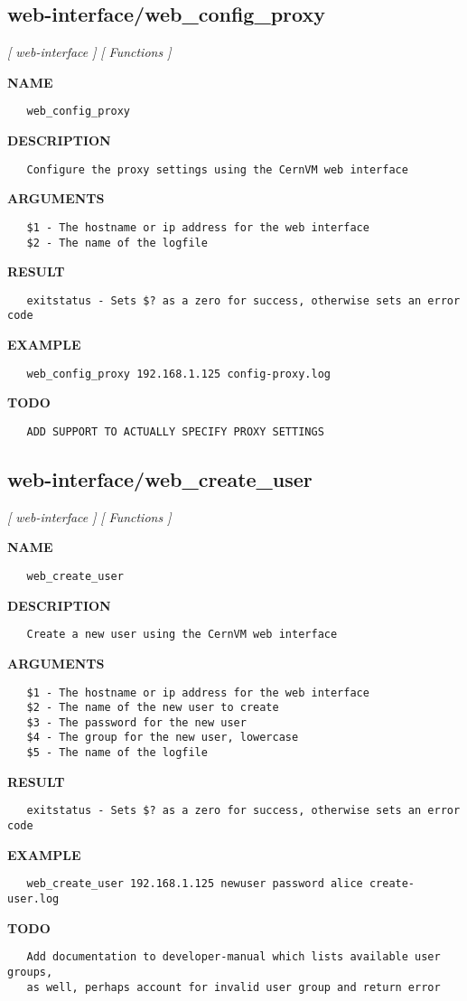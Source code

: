 \subsection{web-interface/web\_config\_proxy}
\textsl{[ web-interface ]}
\textsl{[ Functions ]}

\label{ch:robo75}
\label{ch:web_interface_web_config_proxy}
\textbf{NAME}
\begin{verbatim}
   web_config_proxy
\end{verbatim}
\textbf{DESCRIPTION}
\begin{verbatim}
   Configure the proxy settings using the CernVM web interface
\end{verbatim}
\textbf{ARGUMENTS}
\begin{verbatim}
   $1 - The hostname or ip address for the web interface
   $2 - The name of the logfile
\end{verbatim}
\textbf{RESULT}
\begin{verbatim}
   exitstatus - Sets $? as a zero for success, otherwise sets an error code
\end{verbatim}
\textbf{EXAMPLE}
\begin{verbatim}
   web_config_proxy 192.168.1.125 config-proxy.log
\end{verbatim}
\textbf{TODO}
\begin{verbatim}
   ADD SUPPORT TO ACTUALLY SPECIFY PROXY SETTINGS
\end{verbatim}
\newpage
\subsection{web-interface/web\_create\_user}
\textsl{[ web-interface ]}
\textsl{[ Functions ]}

\label{ch:robo76}
\label{ch:web_interface_web_create_user}
\textbf{NAME}
\begin{verbatim}
   web_create_user
\end{verbatim}
\textbf{DESCRIPTION}
\begin{verbatim}
   Create a new user using the CernVM web interface
\end{verbatim}
\textbf{ARGUMENTS}
\begin{verbatim}
   $1 - The hostname or ip address for the web interface
   $2 - The name of the new user to create
   $3 - The password for the new user
   $4 - The group for the new user, lowercase
   $5 - The name of the logfile
\end{verbatim}
\textbf{RESULT}
\begin{verbatim}
   exitstatus - Sets $? as a zero for success, otherwise sets an error code
\end{verbatim}
\textbf{EXAMPLE}
\begin{verbatim}
   web_create_user 192.168.1.125 newuser password alice create-user.log
\end{verbatim}
\textbf{TODO}
\begin{verbatim}
   Add documentation to developer-manual which lists available user groups,
   as well, perhaps account for invalid user group and return error
\end{verbatim}
\newpage
